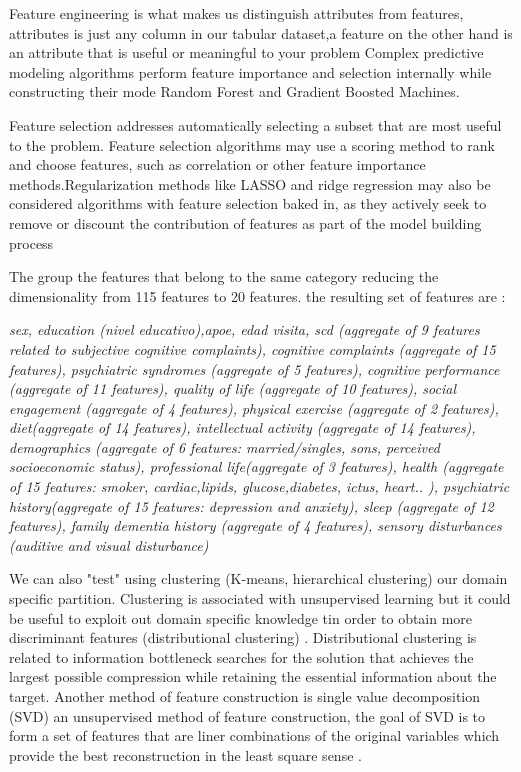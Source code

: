 \documentclass[12pt]{report}
\begin{document}
Feature engineering is what makes us distinguish attributes from features, attributes is just any column in our tabular dataset,a feature on the other hand is an attribute that is useful or meaningful to your problem
Complex predictive modeling algorithms perform feature importance and selection internally while constructing their mode Random Forest and Gradient Boosted Machines.

Feature selection addresses automatically selecting a subset that are most useful to the problem. Feature selection algorithms may use a scoring method to rank and choose features, such as correlation or other feature importance methods.Regularization methods like LASSO and ridge regression may also be considered algorithms with feature selection baked in, as they actively seek to remove or discount the contribution of features as part of the model building process

The group the features that belong to the same category reducing the dimensionality from 115 features to 20 features.
the resulting set of features are : 
\begin{center}
\textit{sex, education (nivel educativo),apoe, edad visita, scd (aggregate of 9 features related to subjective cognitive complaints), cognitive complaints (aggregate of 15 features), psychiatric syndromes (aggregate of 5 features), cognitive performance (aggregate of 11 features), quality of life (aggregate of 10 features), social engagement (aggregate of 4 features), physical exercise (aggregate of 2 features), diet(aggregate of 14 features), intellectual activity (aggregate of 14 features), demographics (aggregate of 6 features: married/singles, sons, perceived socioeconomic status), professional life(aggregate of 3 features), health (aggregate of 15 features: smoker, cardiac,lipids, glucose,diabetes, ictus, heart.. ), psychiatric history(aggregate of 15 features: depression and anxiety), sleep (aggregate of 12 features), family dementia history (aggregate of 4 features), sensory disturbances (auditive and visual disturbance) } 

\end{center}

We can also "test" using clustering (K-means, hierarchical clustering) our domain specific partition. Clustering is associated with unsupervised learning but it could be useful to exploit out domain specific knowledge tin order to obtain more discriminant features (distributional clustering) \cite{guyon2003introduction}. Distributional clustering is related to information bottleneck \cite{tishby2015deep} searches for the solution that achieves the largest possible compression while retaining the essential information about the target.
Another method of feature construction is single value decomposition (SVD) an unsupervised method of feature construction, the goal of SVD is to form a set of features that are liner combinations of the original variables which provide the best reconstruction in the least square sense \cite{duda2012pattern}.  
\end{document}
